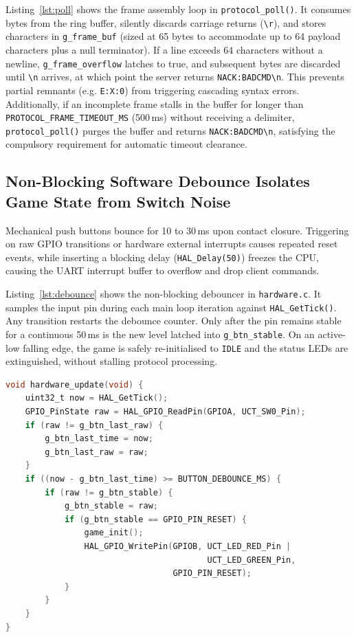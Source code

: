 Listing~\ref{lst:poll} shows the frame assembly loop in \texttt{protocol\_poll()}. It consumes bytes from the ring buffer, silently discards carriage returns (\texttt{\textbackslash r}), and stores characters in \texttt{g\_frame\_buf} (sized at 65 bytes to accommodate up to 64 payload characters plus a null terminator). If a line exceeds 64 characters without a newline, \texttt{g\_frame\_overflow} latches to true, and subsequent bytes are discarded until \texttt{\textbackslash n} arrives, at which point the server returns \texttt{NACK:BADCMD\textbackslash n}. This prevents partial remnants (e.g. \texttt{E:X:0}) from triggering cascading syntax errors. Additionally, if an incomplete frame stalls in the buffer for longer than \texttt{PROTOCOL\_FRAME\_TIMEOUT\_MS} (500\,ms) without receiving a delimiter, \texttt{protocol\_poll()} purges the buffer and returns \texttt{NACK:BADCMD\textbackslash n}, satisfying the compulsory requirement for automatic timeout clearance.

\subsection{Non-Blocking Software Debounce Isolates Game State from Switch Noise}

Mechanical push buttons bounce for 10 to 30\,ms upon contact closure. Triggering on raw GPIO transitions or hardware external interrupts causes repeated reset events, while inserting a blocking delay (\texttt{HAL\_Delay(50)}) freezes the CPU, causing the UART interrupt buffer to overflow and drop client commands.

Listing~\ref{lst:debounce} shows the non-blocking debouncer in \texttt{hardware.c}. It samples the input pin during each main loop iteration against \texttt{HAL\_GetTick()}. Any transition restarts the debounce counter. Only after the pin remains stable for a continuous 50\,ms is the new level latched into \texttt{g\_btn\_stable}. On an active-low falling edge, the game is safely re-initialised to \texttt{IDLE} and the status LEDs are extinguished, without stalling protocol processing.

\begin{lstlisting}[language=C, caption={Non-blocking 50\,ms button debouncer (\texttt{hardware.c}).}, label=lst:debounce]
void hardware_update(void) {
    uint32_t now = HAL_GetTick();
    GPIO_PinState raw = HAL_GPIO_ReadPin(GPIOA, UCT_SW0_Pin);
    if (raw != g_btn_last_raw) {
        g_btn_last_time = now;
        g_btn_last_raw = raw;
    }
    if ((now - g_btn_last_time) >= BUTTON_DEBOUNCE_MS) {
        if (raw != g_btn_stable) {
            g_btn_stable = raw;
            if (g_btn_stable == GPIO_PIN_RESET) {
                game_init();
                HAL_GPIO_WritePin(GPIOB, UCT_LED_RED_Pin | 
                                         UCT_LED_GREEN_Pin, 
                                  GPIO_PIN_RESET);
            }
        }
    }
}
\end{lstlisting}

